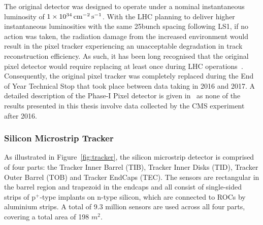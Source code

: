 The original detector was designed to operate under a nominal instantaneous luminosity of $1 \times 10^{34}\,\text{cm}^\text{$-$2}\,\text{s}^\text{$-$1}$.
With the LHC planning to deliver higher instantaneous luminosities with the same 25\ns bunch spacing following LS1, if no action was taken, the radiation damage from the increased \PU environment would result in the pixel tracker experiencing an unacceptable degradation in track reconstruction efficiency.
As such, it has been long recognised that the original pixel detector would require replacing at least once during LHC operations~\cite{CMS:1997tlf}.
Consequently, the original pixel tracker was completely replaced during the End of Year Technical Stop that took place between data taking in 2016 and 2017.
A detailed description of the Phase-I Pixel detector is given in~\cite{CMS:2012sda} as none of the results presented in this thesis involve data collected by the CMS experiment after 2016.

\subsubsection{Silicon Microstrip Tracker}
As illustrated in Figure~\ref{fig:tracker}, the silicon microstrip detector is comprised of four parts: the Tracker Inner Barrel (TIB), Tracker Inner Disks (TID), Tracker Outer Barrel (TOB) and Tracker EndCaps (TEC).
The sensors are rectangular in the barrel region and trapezoid in the endcaps and all consist of single-sided strips of p$^{+}$-type implants on n-type silicon, which are connected to ROCs by aluminium strips.
A total of 9.3 million sensors are used across all four parts, covering a total area of 198 $\unit{m}^{2}$.

